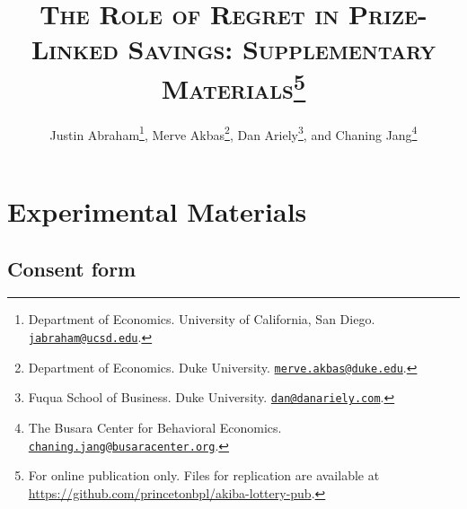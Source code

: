 \documentclass[11pt]{article}
\begin{document}
\title{\textsc{The Role of Regret in Prize-Linked Savings: Supplementary Materials}\protect\footnote{For online publication only. Files for replication are available at \url{https://github.com/princetonbpl/akiba-lottery-pub}.}}

\author{Justin Abraham\thanks{Department of Economics. University of California, San Diego. \protect\href{mailto:jabraham@ucsd.edu}{\nolinkurl{jabraham@ucsd.edu}}.}, Merve Akbas\thanks{Department of Economics. Duke University. \protect\href{mailto:merve.akbas@duke.edu}{\nolinkurl{merve.akbas@duke.edu}}.}, Dan Ariely\thanks{Fuqua School of Business. Duke University. \protect\href{mailto:dan@danariely.com}{\nolinkurl{dan@danariely.com}}.}, and Chaning Jang\thanks{The Busara Center for Behavioral Economics. \protect\href{mailto:chaning.jang@busaracenter.org}{\nolinkurl{chaning.jang@busaracenter.org}}.}} %

\maketitle

\newpage

\tableofcontents

\newpage

\appendix

\section{Experimental Materials}

    \subsection{Consent form}
\end{document}
